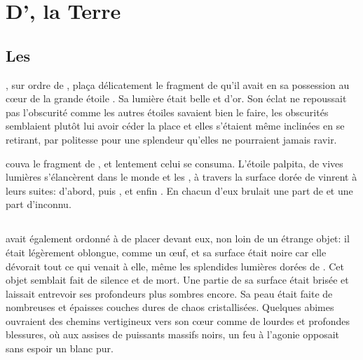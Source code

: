 \chapter{D'\Orba, la Terre}

\section{Les \Ea}

\Carac, sur ordre de \Cind, plaça délicatement le fragment de \Drisst qu'il avait en sa possession au cœur de la grande étoile \Naos. Sa lumière était belle et d'or. Son éclat ne repoussait pas l'obscurité comme les autres étoiles savaient bien le faire, les obscurités semblaient plutôt lui avoir céder la place et elles s'étaient même inclinées en se retirant, par politesse pour une splendeur qu'elles ne pourraient jamais ravir. 

\Naos couva le fragment de \Drisst, et lentement celui se consuma. L'étoile palpita, de vives lumières s'élancèrent dans le monde et les \Ea, à travers la surface dorée de \Naos vinrent à leurs suites: \Oros d'abord, puis \Fercor, et enfin \Nio. En chacun d'eux brulait une part de \Mey et une part d'inconnu.

\section{\Orba}

\Cind avait également ordonné à \Carac de placer devant eux, non loin de \Naos un étrange objet: il était légèrement oblongue, comme un œuf, et sa surface était noire car elle dévorait tout ce qui venait à elle, même les splendides lumières dorées de \Naos. Cet objet semblait fait de silence et de mort. Une partie de sa surface était brisée et laissait entrevoir ses profondeurs plus sombres encore. Sa peau était faite de nombreuses et épaisses couches dures de chaos cristallisées. Quelques abimes ouvraient des chemins vertigineux vers son cœur comme de lourdes et profondes blessures, où aux assises de puissants massifs noirs, un feu à l'agonie opposait sans espoir un blanc pur.         






